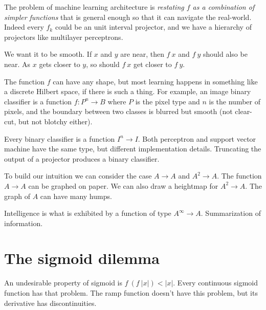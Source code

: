 The problem of machine learning architecture
is \emph{restating \(f\) as a combination of simpler functions}
that is general enough so that it can navigate the real-world.
Indeed every \(f_k\) could be an unit interval projector,
and we have a hierarchy of projectors
like multilayer perceptrons.

We want it to be smooth.
If \(x\) and \(y\) are near,
then \(f~x\) and \(f~y\) should also be near.
As \(x\) gets closer to \(y\), so should \(f~x\) get closer to \(f~y\).

The function \(f\) can have any shape,
but most learning happens in something like a discrete Hilbert space, if there is such a thing.
For example, an image binary classifier is a function \(f : P^n \to B\)
where \(P\) is the pixel type and \(n\) is the number of pixels,
and the boundary between two classes is blurred but smooth
(not clear-cut, but not blotchy either).

Every binary classifier is a function \(I^n \to I\).
Both perceptron and support vector machine have the same type,
but different implementation details.
Truncating the output of a projector produces a binary classifier.

To build our intuition we can consider the case \(A \to A\) and \(A^2 \to A\).
The function \(A \to A\) can be graphed on paper.
We can also draw a heightmap for \(A^2 \to A\).
The graph of \(A\) can have many humps.

Intelligence is what is exhibited by a function of type \(A^\infty \to A\).
Summarization of information.

\section{The sigmoid dilemma}

An undesirable property of sigmoid is \(f~(f~|x|) < |x|\).
Every continuous sigmoid function has that problem.
The ramp function doesn't have this problem,
but its derivative has discontinuities.
